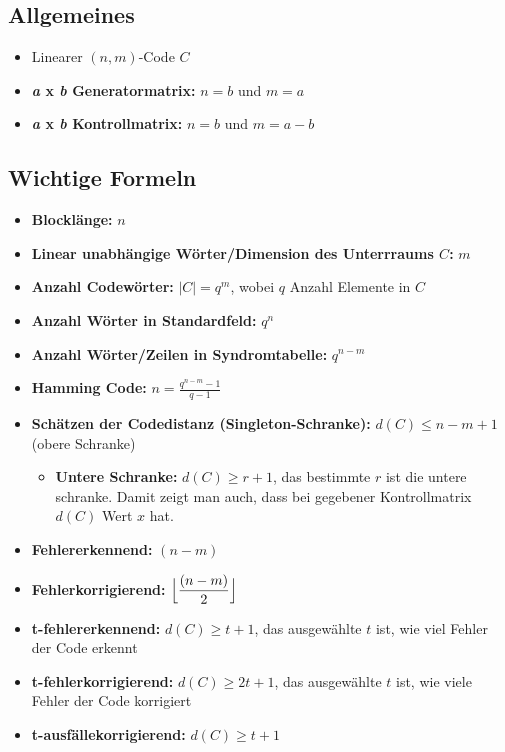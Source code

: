 \subsection{Allgemeines}

\begin{itemize}
\item Linearer $(n,m)$-Code $C$
\item \textbf{\textit{a} x \textit{b} Generatormatrix:} $n = b$ und $m = a$
\item \textbf{\textit{a} x \textit{b} Kontrollmatrix:} $n = b$ und $m = a-b$
\end{itemize}

\subsection{Wichtige Formeln}

\begin{itemize}
\item \textbf{Blocklänge:} $\displaystyle n$
\item \textbf{Linear unabhängige Wörter/Dimension des Unterrraums $C$:} $m$
\item \textbf{Anzahl Codewörter:} $|C| = q^m$, wobei $q$ Anzahl Elemente in $C$
\item \textbf{Anzahl Wörter in Standardfeld:} $q^n$
\item \textbf{Anzahl Wörter/Zeilen in Syndromtabelle:} $q^{n-m}$
\item \textbf{Hamming Code:} $\displaystyle n = \frac{q^{n-m}-1}{q-1}$
\item \textbf{Schätzen der Codedistanz (Singleton-Schranke):} $d(C) \leq n - m + 1$ (obere Schranke)
\begin{itemize}
\item \textbf{Untere Schranke:} $d(C) \geq r + 1$, das bestimmte $r$ ist die untere schranke. Damit zeigt man auch, dass bei gegebener Kontrollmatrix $d(C)$ Wert $x$ hat.
\end{itemize}
\item \textbf{Fehlererkennend:} $(n - m)$
\item \textbf{Fehlerkorrigierend:} $\displaystyle \Bigl\lfloor \frac{(n - m)}{2} \Bigr\rfloor$
\item \textbf{t-fehlererkennend:} $d(C) \geq t + 1$, das ausgewählte $t$ ist, wie viel Fehler der Code erkennt
\item \textbf{t-fehlerkorrigierend:} $d(C) \geq 2t + 1$, das ausgewählte $t$ ist, wie viele Fehler der Code korrigiert
\item \textbf{t-ausfällekorrigierend:} $d(C) \geq t + 1$
\end{itemize}\

